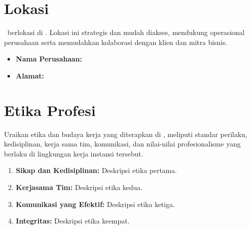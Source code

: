 \section{Lokasi \NamaPerusahaan}

\NamaPerusahaan\ berlokasi di \AlamatPerusahaan. Lokasi ini strategis dan mudah
diakses, mendukung operasional perusahaan serta memudahkan kolaborasi dengan
klien dan mitra bisnis.

\begin{itemize}[leftmargin=*, itemsep=0pt]
  \item \textbf{Nama Perusahaan:} \NamaPerusahaan
  \item \textbf{Alamat:} \AlamatPerusahaan
\end{itemize}


\section{Etika Profesi}

Uraikan etika dan budaya kerja yang diterapkan di \NamaPerusahaan, meliputi
standar perilaku, kedisiplinan, kerja sama tim, komunikasi, dan nilai-nilai
profesionalisme yang berlaku di lingkungan kerja instansi tersebut.

\begin{enumerate}[label=\arabic*., leftmargin=*, itemsep=0pt]
  \item \textbf{Sikap dan Kedisiplinan:} Deskripsi etika pertama.
  \item \textbf{Kerjasama Tim:} Deskripsi etika kedua.
  \item \textbf{Komunikasi yang Efektif:} Deskripsi etika ketiga.
  \item \textbf{Integritas:} Deskripsi etika keempat.
\end{enumerate}
